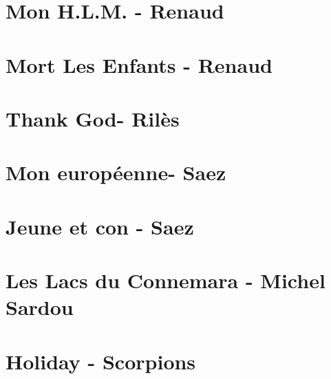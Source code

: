 \documentclass{guitartabs}
\begin{document}
\section*{Mon H.L.M. - Renaud}
\begin{guitar}

\end{guitar}

\section{Mort Les Enfants - Renaud}
\begin{guitar}

\end{guitar}

\section{Thank God- Rilès}
\begin{guitar}

\end{guitar}

\section{Mon européenne- Saez}
\begin{guitar}

\end{guitar}


\section{Jeune et con - Saez}
\begin{guitar}

\end{guitar}

\section{Les Lacs du Connemara - Michel Sardou}
\begin{guitar}

\end{guitar}

\section*{Holiday - Scorpions}
\begin{guitar}

\end{guitar}
\end{document}
